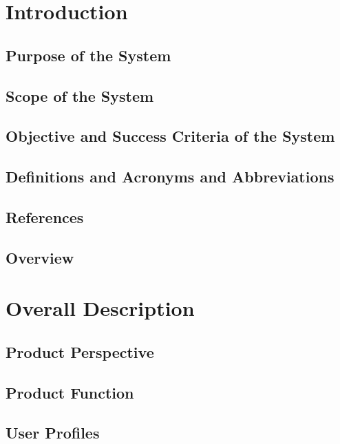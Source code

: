 \documentclass[11pt]{article}
\begin{document}
\tableofcontents
\newpage

\section{Introduction}

    \subsection{Purpose of the System}

    \subsection{Scope of the System}

    \subsection{Objective and Success Criteria of the System}

    \subsection{Definitions and Acronyms and Abbreviations}

    \subsection{References}

    \subsection{Overview}



\section{Overall Description}

    \subsection{Product Perspective}

    \subsection{Product Function}

    \subsection{User Profiles}
\end{document}
